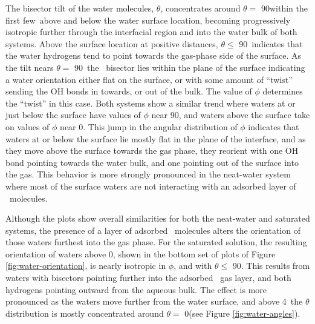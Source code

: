 \documentclass{article}
\begin{document}
The bisector tilt of the water molecules, $\theta$, concentrates around $\theta=$ 90\textdegree within the first few\angs~above and below the water surface location, becoming progressively isotropic further through the interfacial region and into the water bulk of both systems. Above the surface location at positive distances, $\theta \leq$ 90\textdegree~indicates that the water hydrogens tend to point towards the gas-phase side of the surface. As the tilt nears $\theta=$ 90\textdegree~the \wat~bisector lies within the plane of the surface indicating a water orientation either flat on the surface, or with some amount of ``twist'' sending the OH bonds in towards, or out of the bulk. The value of $\phi$ determines the ``twist'' in this case. Both systems show a similar trend where waters at or just below the surface have values of $\phi$ near 90\textdegree, and waters above the surface take on values of $\phi$ near 0\textdegree. This jump in the angular distribution of $\phi$ indicates that waters at or below the surface lie mostly flat in the plane of the interface, and as they move above the surface towards the gas phase, they reorient with one OH bond pointing towards the water bulk, and one pointing out of the surface into the gas. This behavior is more strongly pronounced in the neat-water system where most of the surface waters are not interacting with an adsorbed layer of \suldiox~molecules.


Although the plots show overall similarities for both the neat-water and saturated systems, the presence of a layer of adsorbed \suldiox~molecules alters the orientation of those waters furthest into the gas phase. For the saturated solution, the resulting orientation of waters above 0\angs, shown in the bottom set of plots of Figure \ref{fig:water-orientation}, is nearly isotropic in $\phi$, and with $\theta \leq$ 90\textdegree. This results from waters with bisectors pointing further into the adsorbed \suldiox~gas layer, and both hydrogens pointing outward from the aqueous bulk. The effect is more pronounced as the waters move further from the water surface, and above 4\angs~the $\theta$ distribution is mostly concentrated around $\theta=$ 0\textdegree (see Figure \ref{fig:water-angles}).
\end{document}

